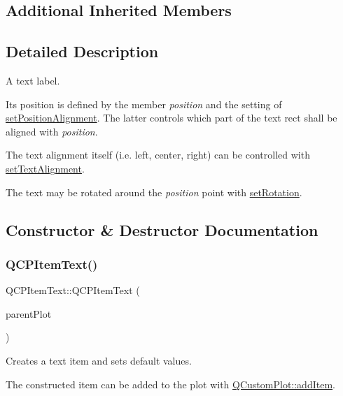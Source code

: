 \subsection*{Additional Inherited Members}


\subsection{Detailed Description}
A text label. 

 Its position is defined by the member {\itshape position} and the setting of \hyperlink{class_q_c_p_item_text_a781cdf8c640fc6a055dcff1e675c8c7a}{set\+Position\+Alignment}. The latter controls which part of the text rect shall be aligned with {\itshape position}.

The text alignment itself (i.\+e. left, center, right) can be controlled with \hyperlink{class_q_c_p_item_text_ab5bc0684c4d1bed81949a11b34dba478}{set\+Text\+Alignment}.

The text may be rotated around the {\itshape position} point with \hyperlink{class_q_c_p_item_text_a4bcc10cd97952c3f749d75824b5077f0}{set\+Rotation}. 

\subsection{Constructor \& Destructor Documentation}
\hypertarget{class_q_c_p_item_text_a77ff96a2972a00872ff8f8c67143abbe}{}\label{class_q_c_p_item_text_a77ff96a2972a00872ff8f8c67143abbe} 
\subsubsection{\texorpdfstring{Q\+C\+P\+Item\+Text()}{QCPItemText()}}
{\footnotesize\ttfamily Q\+C\+P\+Item\+Text\+::\+Q\+C\+P\+Item\+Text (\begin{DoxyParamCaption}\item[{\hyperlink{class_q_custom_plot}{Q\+Custom\+Plot} $\ast$}]{parent\+Plot }\end{DoxyParamCaption})}

Creates a text item and sets default values.

The constructed item can be added to the plot with \hyperlink{class_q_custom_plot_aa500620379262321685cb7a7674cbd2a}{Q\+Custom\+Plot\+::add\+Item}. 

